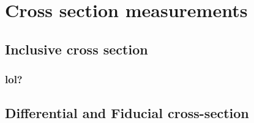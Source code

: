 \section{Cross section measurements}

\subsection{Inclusive cross section}

\subsubsection{lol?}

\subsection{Differential and Fiducial cross-section}